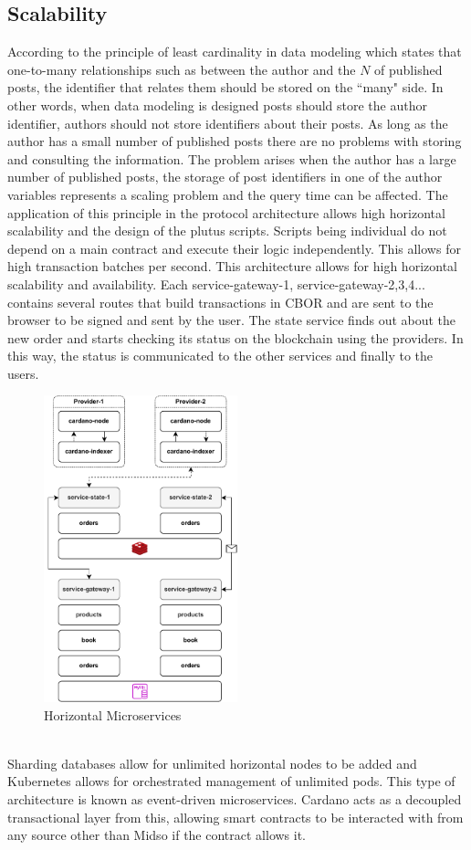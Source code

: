 \documentclass[12pt]{article}
\begin{document}
\subsection { Scalability } 

According to the principle of least cardinality in data modeling which states that one-to-many relationships such as between the author and the $N$ of published posts, the identifier that relates them should be stored on the ``many" side. In other words, when data modeling is designed posts should store the author identifier, authors should not store identifiers about their posts. As long as the author has a small number of published posts there are no problems with storing and consulting the information. The problem arises when the author has a large number of published posts, the storage of post identifiers in one of the author variables represents a scaling problem and the query time can be affected.
The application of this principle in the protocol architecture allows high horizontal scalability and the design of the plutus scripts. Scripts being individual do not depend on a main contract and execute their logic independently. This allows for high transaction batches per second. This architecture allows for high horizontal scalability and availability. Each service-gateway-1, service-gateway-2,3,4... contains several routes that build transactions in CBOR and are sent to the browser to be signed and sent by the user. The state service finds out about the new order and starts checking its status on the blockchain using the providers. In this way, the status is communicated to the other services and finally to the users.
\begin{figure}[ht]
  \centering
  \includegraphics[width=0.5\textwidth]{horizontal.drawio.pdf}
  \caption{Horizontal Microservices}
  \label{fig:microservices}
\end{figure}
\\
Sharding databases allow for unlimited horizontal nodes to be added and Kubernetes allows for orchestrated management of unlimited pods. This type of architecture is known as event-driven microservices. Cardano acts as a decoupled transactional layer from this, allowing smart contracts to be interacted with from any source other than Midso if the contract allows it.
\end{document}
